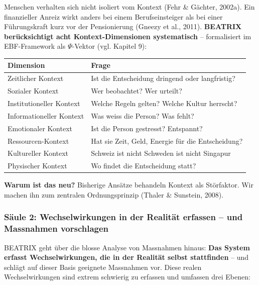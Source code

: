 \documentclass[11pt,a4paper]{article}
\begin{document}
Menschen verhalten sich nicht isoliert vom Kontext (Fehr \& Gächter, 2002a). Ein finanzieller Anreiz wirkt anders bei einem Berufseinsteiger als bei einer Führungskraft kurz vor der Pensionierung (Gneezy et al., 2011). \textbf{BEATRIX berücksichtigt acht Kontext-Dimensionen systematisch} -- formalisiert im EBF-Framework als $\Psi$-Vektor (vgl. Kapitel 9):

\begin{table}[h]
\centering
\begin{tabular}{@{}L{4cm}L{9cm}@{}}
\toprule
\textbf{Dimension} & \textbf{Frage} \\
\midrule
Zeitlicher Kontext & Ist die Entscheidung dringend oder langfristig? \\
Sozialer Kontext & Wer beobachtet? Wer urteilt? \\
Institutioneller Kontext & Welche Regeln gelten? Welche Kultur herrscht? \\
Informationeller Kontext & Was weiss die Person? Was fehlt? \\
Emotionaler Kontext & Ist die Person gestresst? Entspannt? \\
Ressourcen-Kontext & Hat sie Zeit, Geld, Energie für die Entscheidung? \\
Kultureller Kontext & Schweiz ist nicht Schweden ist nicht Singapur \\
Physischer Kontext & Wo findet die Entscheidung statt? \\
\bottomrule
\end{tabular}
\end{table}

\textbf{Warum ist das neu?} Bisherige Ansätze behandeln Kontext als Störfaktor. Wir machen ihn zum zentralen Ordnungsprinzip (Thaler \& Sunstein, 2008).

\subsubsection{Säule 2: Wechselwirkungen in der Realität erfassen -- und Massnahmen vorschlagen}

BEATRIX geht über die blosse Analyse von Massnahmen hinaus: \textbf{Das System erfasst Wechselwirkungen, die in der Realität selbst stattfinden} -- und schlägt auf dieser Basis geeignete Massnahmen vor. Diese realen Wechselwirkungen sind extrem schwierig zu erfassen und umfassen drei Ebenen:
\end{document}
